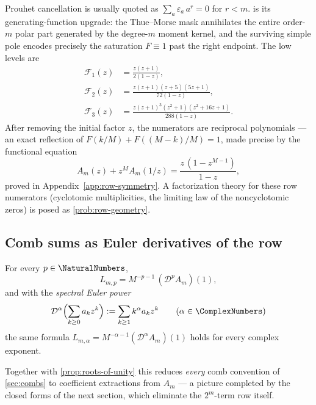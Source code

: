 \documentclass[11pt,oneside]{article}
\numberwithin{equation}{section}
\theoremstyle{definition}
\theoremstyle{remark}
\newcommand{\eps}{\varepsilon}
\newcommand{\Dop}{\mathcal D}
\newcommand{\Frow}{\mathscr F}
\begin{document}
\begin{remark}
Prouhet cancellation is usually quoted as
$\sum_a\eps_a\,a^{r}=0$ for $r<m$.   is its
generating-function upgrade: the Thue--Morse mask annihilates the
entire order-$m$ polar part generated by the degree-$m$ moment kernel,
and the surviving simple pole encodes precisely the saturation
$F\equiv1$ past the right endpoint.  The low levels are
\begin{align}
 \Frow_1(z)&=\frac{z(z+1)}{2(1-z)},
 \label{eq:row-N1}\\
 \Frow_2(z)&=\frac{z(z+1)(z+5)(5z+1)}{72(1-z)},
 \label{eq:row-N2}\\
 \Frow_3(z)&=\frac{z(z+1)^{3}(z^{2}+1)(z^{2}+16z+1)}{288(1-z)}.
 \label{eq:row-N3}
\end{align}
After removing the initial factor $z$, the numerators are reciprocal
polynomials --- an exact reflection of $F(k/M)+F((M-k)/M)=1$, made
precise by the functional equation
\begin{equation}
 A_m(z)+z^{M}A_m(1/z)
 =\frac{z\,(1-z^{M-1})}{1-z},
 \label{eq:AN-reciprocal}
\end{equation}
proved in Appendix~\ref{app:row-symmetry}.  A factorization theory for these
row numerators (cyclotomic multiplicities, the limiting law of the
noncyclotomic zeros) is posed as \cref{prob:row-geometry}.
\end{remark}

\subsection{Comb sums as Euler derivatives of the row}

\begin{corollary}
\label{cor:euler-powers}
For every $p\in\NaturalNumbers$,
\begin{equation}
 L_{m,p}=M^{-p-1}\,(\Dop^{p}A_m)(1),
 \label{eq:euler-natural}
\end{equation}
and with the \emph{spectral Euler power}
\begin{equation}
 \Dop^{\alpha}\Bigl(\sum_{k\ge0}a_kz^{k}\Bigr)
 :=\sum_{k\ge1}k^{\alpha}a_kz^{k}
 \qquad(\alpha\in\ComplexNumbers)
 \label{eq:fractional-Euler}
\end{equation}
the same formula
$L_{m,\alpha}=M^{-\alpha-1}(\Dop^{\alpha}A_m)(1)$ holds for every
complex exponent.
\end{corollary}

Together with \cref{prop:roots-of-unity} this reduces \emph{every}
comb convention of \cref{sec:combs} to coefficient extractions from
$A_m$ --- a picture completed by the closed forms of the next section,
which eliminate the $2^{m}$-term row itself.
\end{document}
